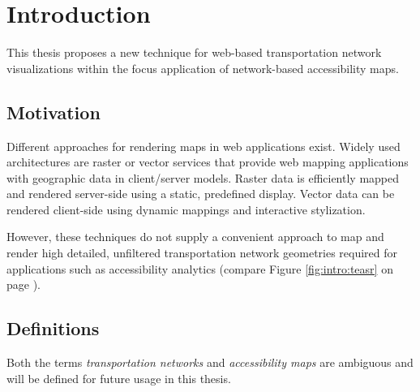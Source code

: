 
\cleardoublepage
\chapter{Introduction}
  \label{chap:intro}
  This thesis proposes a new technique for web-based transportation network
  visualizations within the focus application of network-based accessibility
  maps.\par

  \section{Motivation}
    \label{sec:intro:motiv}
    Different approaches for rendering maps in web applications exist.
    Widely used architectures are raster or vector services that provide web
    mapping applications with geographic data in client/server models.
    Raster data is efficiently mapped and rendered server-side using a
    static, predefined display. Vector data can be rendered client-side
    using dynamic mappings and interactive stylization.\par

    However, these techniques do not supply a convenient approach to map and
    render high detailed, unfiltered transportation network geometries
    required for applications such as accessibility analytics (compare Figure
    \ref{fig:intro:teasr} on page \pageref{fig:intro:teasr}).\par

  \section{Definitions}
    \label{sec:intro:def}

    Both the terms \textit{transportation networks} and \textit{accessibility
    maps} are ambiguous and will be defined for future usage in this
    thesis.\par

